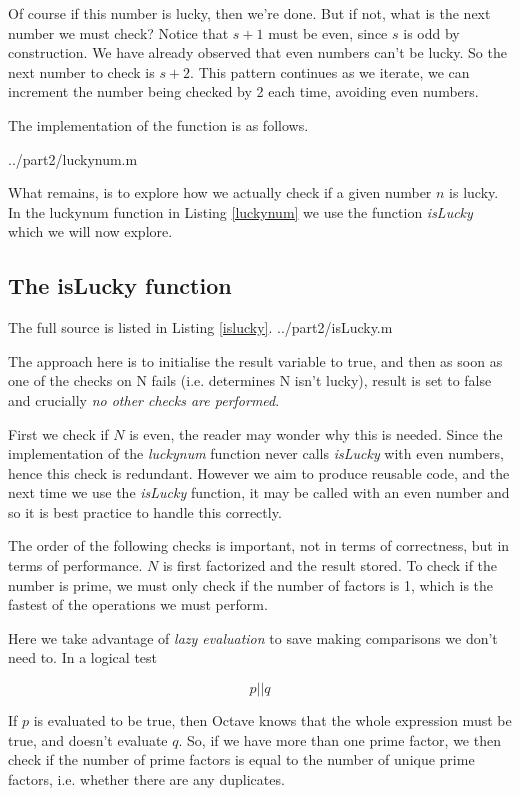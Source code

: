 \documentclass[10pt]{article}
\begin{document}
Of course if this number is lucky, then we're done. But if not, what is the next number we must check? Notice that $s + 1$ must be even, since $s$ is odd by construction. We have already observed that even numbers can't be lucky. So the next number to check is $s+2$. This pattern continues as we iterate, we can increment the number being checked by 2 each time, avoiding even numbers.

The implementation of the function is as follows.

   {../part2/luckynum.m}

What remains, is to explore how we actually check if a given number $n$ is lucky. In the luckynum function in Listing \ref{luckynum} we use the function \emph{isLucky} which we will now explore.

  
\subsection{The isLucky function}

The full source is listed in Listing \ref{islucky}.
   {../part2/isLucky.m}
  
The approach here is to initialise the result variable to true, and then as soon as one of the checks on N fails (i.e. determines N isn't lucky), result is set to false and crucially \emph{no other checks are performed}. 

First we check if $N$ is even, the reader may wonder why this is needed. Since the implementation of the \emph{luckynum} function never calls \emph{isLucky} with even numbers, hence this check is redundant. However we aim to produce reusable code, and the next time we use the \emph{isLucky} function, it may be called with an even number and so it is best practice to handle this correctly.

The order of the following checks is important, not in terms of correctness, but in terms of performance. $N$ is first factorized and the result stored. To check if the number is prime, we must only check if the number of factors is 1, which is the fastest of the operations we must perform.

Here we take advantage of \emph{lazy evaluation} to save making comparisons we don't need to. In a logical test

$$ p || q $$

If $p$ is evaluated to be true, then Octave knows that the whole expression must be true, and doesn't evaluate $q$. So, if we have more than one prime factor, we then check if the number of prime factors is equal to the number of unique prime factors, i.e. whether there are any duplicates.
\end{document}
